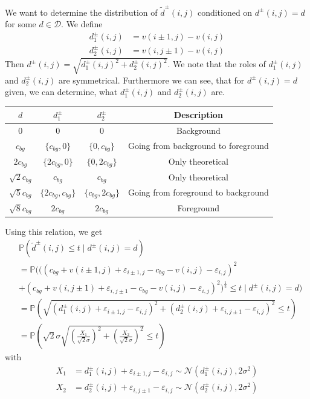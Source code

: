 \documentclass[a4paper,12pt]{article}
\theoremstyle{plain}
\theoremstyle{definition}
\theoremstyle{remark}
\begin{document}
We want to determine the distribution of $\tilde{d}^\pm(i, j)$ conditioned on $d^\pm(i, j) = d$ for some $d \in \mathcal{D}$. We define
\begin{align*}
	d_1^\pm(i, j) &= v(i \pm 1, j) - v(i, j) \\
	d_2^\pm(i, j) &= v(i, j \pm 1) - v(i, j)
\end{align*}
Then $d^\pm(i, j) = \sqrt{d_1^\pm(i, j)^2 + d_2^\pm(i, j)^2}$. We note that the roles of $d_1^\pm(i, j)$ and $d_2^\pm(i, j)$ are symmetrical. Furthermore we can see, that for $d^\pm(i, j) = d$ given, we can determine, what $d_1^\pm(i, j)$ and $d_2^\pm(i, j)$ are.

\begin{center}
	\begin{tabular}{c|c|c|c}
		$d$ & $d_1^\pm$ & $d_2^\pm$ & Description \\
		\hline
		$0$ & $0$ & $0$ & Background \\
		\hline
		$c_{bg}$ & $\{ c_{bg}, 0 \}$ & $\{ 0, c_{bg} \}$ & Going from background to foreground \\
		\hline
		$2 c_{bg}$ & $\{ 2 c_{bg}, 0 \}$ & $\{ 0, 2 c_{bg} \}$ & Only theoretical \\
		\hline
		$\sqrt{2} c_{bg}$ & $c_{bg}$ & $c_{bg}$ & Only theoretical \\
		\hline
		$\sqrt{5} c_{bg}$ & $\{ 2 c_{bg}, c_{bg} \}$ & $\{ c_{bg}, 2 c_{bg} \}$ & Going from foreground to background \\
		\hline
		$\sqrt{8} c_{bg}$ & $2 c_{bg}$ & $2 c_{bg}$ & Foreground \\
	\end{tabular}
\end{center}

Using this relation, we get
\begin{align*}
	&\mathbb{P}(\tilde{d}^\pm(i, j) \leq t \mid d^\pm(i, j) = d) \\
	&= \mathbb{P}(( (c_{bg} + v(i \pm 1, j) + \varepsilon_{i \pm 1, j} - c_{bg} - v(i, j) - \varepsilon_{i, j})^2 \\
	&+ (c_{bg} + v(i, j \pm 1) + \varepsilon_{i, j \pm 1} - c_{bg} - v(i, j) - \varepsilon_{i, j})^2 )^{\frac{1}{2}} \leq t \mid d^\pm(i, j) = d) \\
	&= \mathbb{P}\left( \sqrt{(d_1^\pm(i, j) + \varepsilon_{i \pm 1, j} - \varepsilon_{i, j})^2 + (d_2^\pm(i, j) + \varepsilon_{i, j \pm 1} - \varepsilon_{i, j})^2} \leq t \right) \\
	&= \mathbb{P}\left( \sqrt{2} \sigma \sqrt{\left( \frac{X_1}{\sqrt{2} \sigma} \right)^2 + \left( \frac{X_2}{\sqrt{2} \sigma} \right)^2} \leq t \right)
\end{align*}
with
\begin{align*}
	X_1 &= d_1^\pm(i, j) + \varepsilon_{i \pm 1, j} - \varepsilon_{i, j} \sim \mathcal{N}(d_1^\pm(i, j), 2 \sigma^2) \\
	X_2 &= d_2^\pm(i, j) + \varepsilon_{i, j \pm 1} - \varepsilon_{i, j} \sim \mathcal{N}(d_2^\pm(i, j), 2 \sigma^2)
\end{align*}
\end{document}
